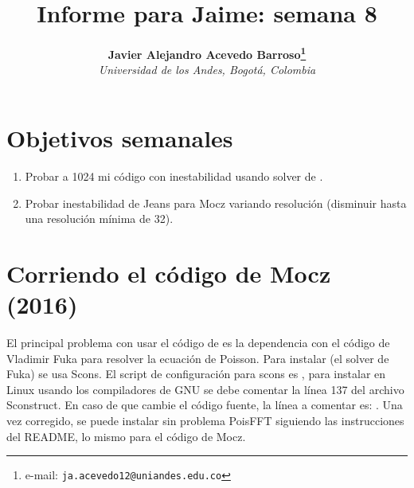 \documentclass[notitlepage,letterpaper,12pt]{article} %
\begin{document}
\title{Informe para Jaime: semana 8}
\author{
\textbf{Javier Alejandro Acevedo Barroso\thanks{e-mail: \texttt{ja.acevedo12@uniandes.edu.co}}}\\
\textit{Universidad de los Andes, Bogotá, Colombia}\\
} %

\maketitle %






 

\section{Objetivos semanales}
\begin{enumerate}
\item Probar a 1024 mi código con inestabilidad usando solver de \citet{FUKA2015356}.
\item Probar inestabilidad de Jeans para Mocz variando resolución (disminuir hasta una resolución mínima de 32).
\end{enumerate}

\section{Corriendo el código de Mocz (2016)}
El principal problema con usar el código de \citet{integerLatticeDynamics} es la dependencia con el código de Vladimir Fuka para resolver la ecuación de Poisson.
Para instalar  (el solver de Fuka) se usa Scons.
El script de configuración para scons es , para instalar en Linux usando los compiladores de GNU se debe comentar la línea 137 del archivo Sconstruct.
En caso de que cambie el código fuente, la línea a comentar es: .
Una vez corregido, se puede instalar sin problema PoisFFT siguiendo las instrucciones del README, lo mismo para el código de Mocz.
\end{document}
